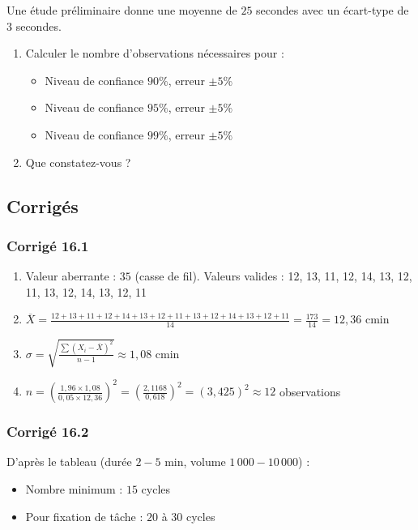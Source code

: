 \documentclass[a4paper,12pt]{article}
\begin{document}
Une étude préliminaire donne une moyenne de $25$ secondes avec un écart-type de $3$ secondes.

\begin{enumerate}
    \item Calculer le nombre d'observations nécessaires pour :
    \begin{itemize}
        \item Niveau de confiance $90\%$, erreur $\pm 5\%$
        \item Niveau de confiance $95\%$, erreur $\pm 5\%$
        \item Niveau de confiance $99\%$, erreur $\pm 5\%$
    \end{itemize}
    \item Que constatez-vous ?
\end{enumerate}

\subsection{Corrigés}

\subsubsection*{Corrigé 16.1}

\begin{enumerate}
    \item Valeur aberrante : $35$ (casse de fil). Valeurs valides : 12, 13, 11, 12, 14, 13, 12, 11, 13, 12, 14, 13, 12, 11
    \item $\overline{X} = \frac{12+13+11+12+14+13+12+11+13+12+14+13+12+11}{14} = \frac{173}{14} = 12,36$ cmin
    \item $\sigma = \sqrt{\frac{\sum (X_i - \overline{X})^2}{n-1}} \approx 1,08$ cmin
    \item $n = \left(\frac{1,96 \times 1,08}{0,05 \times 12,36}\right)^2 = \left(\frac{2,1168}{0,618}\right)^2 = (3,425)^2 \approx 12$ observations
\end{enumerate}

\subsubsection*{Corrigé 16.2}

D'après le tableau (durée $2-5$ min, volume $1\,000-10\,000$) :
\begin{itemize}
    \item Nombre minimum : $15$ cycles
    \item Pour fixation de tâche : $20$ à $30$ cycles
\end{itemize}
\end{document}
